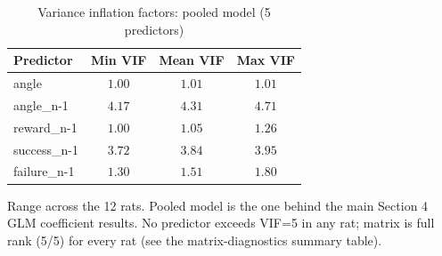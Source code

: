 \begin{table}[htbp]
\centering
\caption{Variance inflation factors: pooled model (5 predictors)}
\label{tab:vif-pooled}
\begin{tabular}{lccc}
\toprule
Predictor & Min VIF & Mean VIF & Max VIF \\
\midrule
angle & $1.00$ & $1.01$ & $1.01$ \\
angle\_n-1 & $4.17$ & $4.31$ & $4.71$ \\
reward\_n-1 & $1.00$ & $1.05$ & $1.26$ \\
success\_n-1 & $3.72$ & $3.84$ & $3.95$ \\
failure\_n-1 & $1.30$ & $1.51$ & $1.80$ \\
\bottomrule
\end{tabular}
\vspace{4pt}
\par\noindent
\begin{minipage}{\linewidth}\small Range across the 12 rats. Pooled model is the one behind the main Section 4 GLM coefficient results. No predictor exceeds VIF=5 in any rat; matrix is full rank (5/5) for every rat (see the matrix-diagnostics summary table).\end{minipage}
\end{table}
